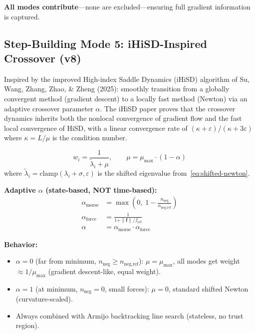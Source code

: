 \documentclass[11pt,a4paper]{article}
\newcommand{\vect}[1]{\mathbf{#1}}
\newcommand{\eval}{\lambda}
\begin{document}
\textbf{All modes contribute}---none are excluded---ensuring full gradient information is captured.

\subsection{Step-Building Mode 5: iHiSD-Inspired Crossover (v8)}
\label{sec:crossover}

Inspired by the improved High-index Saddle Dynamics (iHiSD) algorithm of Su, Wang, Zhang, Zhao, \& Zheng (2025): smoothly transition from a globally convergent method (gradient descent) to a locally fast method (Newton) via an adaptive crossover parameter $\alpha$. The iHiSD paper proves that the crossover dynamics inherits both the nonlocal convergence of gradient flow and the fast local convergence of HiSD, with a linear convergence rate of $(\kappa + \varepsilon)/(\kappa + 3\varepsilon)$ where $\kappa = L/\mu$ is the condition number.

\begin{equation}
  w_i = \frac{1}{\tilde{\eval}_i + \mu}, \qquad \mu = \mu_\text{max} \cdot (1 - \alpha)
  \label{eq:crossover-weight}
\end{equation}
where $\tilde{\eval}_i = \text{clamp}(\eval_i + \sigma, \varepsilon)$ is the shifted eigenvalue from~\eqref{eq:shifted-newton}.

\textbf{Adaptive $\alpha$ (state-based, NOT time-based):}
\begin{align}
  \alpha_\text{morse} &= \max\!\left(0,\; 1 - \frac{n_\text{neg}}{n_\text{neg,ref}}\right) \label{eq:alpha-morse} \\
  \alpha_\text{force} &= \frac{1}{1 + \|\vect{f}\|/f_\text{ref}} \label{eq:alpha-force} \\
  \alpha &= \alpha_\text{morse} \cdot \alpha_\text{force} \label{eq:alpha}
\end{align}

\textbf{Behavior:}
\begin{itemize}
  \item $\alpha = 0$ (far from minimum, $n_\text{neg} \geq n_\text{neg,ref}$): $\mu = \mu_\text{max}$, all modes get weight $\approx 1/\mu_\text{max}$ (gradient descent-like, equal weight).
  \item $\alpha = 1$ (at minimum, $n_\text{neg} = 0$, small forces): $\mu = 0$, standard shifted Newton (curvature-scaled).
  \item Always combined with Armijo backtracking line search (stateless, no trust region).
\end{itemize}
\end{document}
